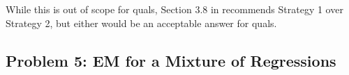\begin{enumerate}
While this is out of scope for quals, Section 3.8 in \cite{davison_hinkley_1997} recommends Strategy 1 over Strategy 2, but either would be an acceptable answer for quals.






\end{enumerate}


\subsection*{Problem 5: EM for a Mixture of Regressions}

